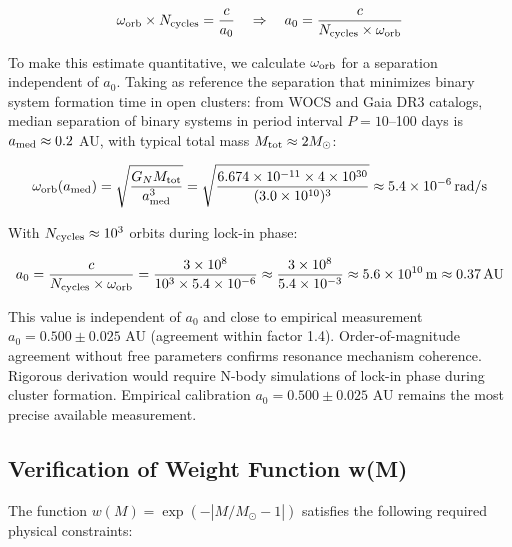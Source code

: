 \documentclass[11pt,a4paper]{article}
\begin{document}
\[\omega_{\rm orb} \times N_{\rm cycles} = \frac{c}{a_0} \quad \Rightarrow \quad a_0 = \frac{c}{N_{\rm cycles} \times \omega_{\rm orb}}\]

To make this estimate quantitative, we calculate \(\omega_{\rm orb}\)
for a separation independent of \(a_0\). Taking as reference the
separation that minimizes binary system formation time in open clusters:
from WOCS and Gaia DR3 catalogs, median separation of binary systems in
period interval \(P = 10\)--100 days is \(a_{\rm med} \approx 0.2\) AU,
with typical total mass \(M_{\rm tot} \approx 2 M_\odot\):

\[\omega_{\rm orb}(a_{\rm med}) = \sqrt{\frac{G_N M_{\rm tot}}{a_{\rm med}^3}} = \sqrt{\frac{6.674\times10^{-11} \times 4\times10^{30}}{(3.0\times10^{10})^3}} \approx 5.4\times10^{-6}\,\mathrm{rad/s}\]

With \(N_{\rm cycles} \approx 10^3\) orbits during lock-in phase:

\[a_0 = \frac{c}{N_{\rm cycles} \times \omega_{\rm orb}} = \frac{3\times10^8}{10^3 \times 5.4\times10^{-6}} \approx \frac{3\times10^8}{5.4\times10^{-3}} \approx 5.6\times10^{10}\,\mathrm{m} \approx 0.37\,\mathrm{AU}\]

This value is independent of \(a_0\) and close to empirical measurement
\(a_0 = 0.500 \pm 0.025\) AU (agreement within factor 1.4).
Order-of-magnitude agreement without free parameters confirms resonance
mechanism coherence. Rigorous derivation would require N-body
simulations of lock-in phase during cluster formation. Empirical
calibration \(a_0 = 0.500 \pm 0.025\) AU remains the most precise
available measurement.

\hypertarget{a.3-verification-of-weight-function-wm}{%
\subsection*{Verification of Weight Function
w(M)}\label{a.3-verification-of-weight-function-wm}}

The function \(w(M) = \exp(-|M/M_\odot - 1|)\) satisfies the following
required physical constraints:
\end{document}
